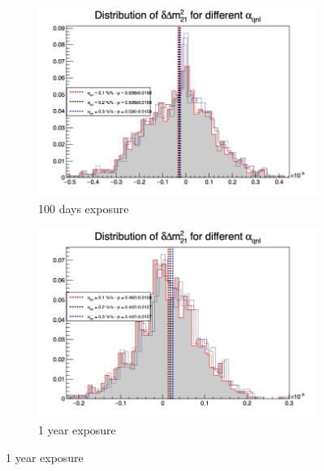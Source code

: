 \documentclass[../main.tex]{subfiles}
\begin{document}
\begin{figure}[th]
  \centering
  \begin{subfigure}[t]{0.48\linewidth}
    \includegraphics[width=\linewidth]{images/joint_fit/stat_tests/chi2_delta_m_100d.png}
    \caption{100 days exposure}
  \end{subfigure}
  \begin{subfigure}[t]{0.48\linewidth}
    \includegraphics[width=\linewidth]{images/joint_fit/stat_tests/chi2_delta_m_1y.png}
    \caption{1 year exposure}
  \end{subfigure}



\end{figure}
\end{document}
